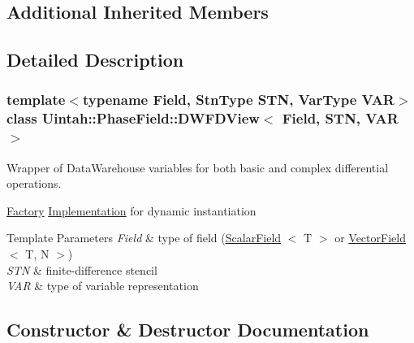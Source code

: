 \subsection*{Additional Inherited Members}


\subsection{Detailed Description}
\subsubsection*{template$<$typename Field, Stn\+Type S\+TN, Var\+Type V\+AR$>$\newline
class Uintah\+::\+Phase\+Field\+::\+D\+W\+F\+D\+View$<$ Field, S\+T\+N, V\+A\+R $>$}

Wrapper of Data\+Warehouse variables for both basic and complex differential operations. 

\hyperlink{classUintah_1_1PhaseField_1_1Factory}{Factory} \hyperlink{classUintah_1_1PhaseField_1_1Implementation}{Implementation} for dynamic instantiation


\begin{DoxyTemplParams}{Template Parameters}
{\em Field} & type of field (\hyperlink{structUintah_1_1PhaseField_1_1ScalarField}{Scalar\+Field} $<$ T $>$ or \hyperlink{structUintah_1_1PhaseField_1_1VectorField}{Vector\+Field} $<$ T, N $>$) \\
\hline
{\em S\+TN} & finite-\/difference stencil \\
\hline
{\em V\+AR} & type of variable representation \\
\hline
\end{DoxyTemplParams}


\subsection{Constructor \& Destructor Documentation}
\mbox{\label{classUintah_1_1PhaseField_1_1DWFDView_ab115fc3f9a50511556f3334799cff71f}} 
